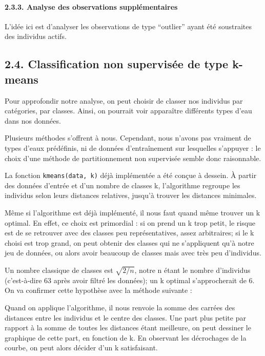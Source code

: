 \documentclass[]{article}
\let\oldparagraph\paragraph
\renewcommand{\paragraph}[1]{\oldparagraph{#1}\mbox{}}
\begin{document}
\hypertarget{analyse-des-observations-supplementaires-1}{\paragraph{2.3.3.
Analyse des observations
supplémentaires}\label{analyse-des-observations-supplementaires-1}}

L'idée ici est d'analyser les observations de type ``outlier'' ayant été
soustraites des individus actifs.

\hypertarget{classification-non-supervisee-de-type-k-means}{\subsection{2.4.
Classification non supervisée de type
k-means}\label{classification-non-supervisee-de-type-k-means}}

Pour approfondir notre analyse, on peut choisir de classer nos individus
par catégories, par classes. Ainsi, on pourrait voir apparaître
différents types d'eau dans nos données.

Plusieurs méthodes s'offrent à nous. Cependant, nous n'avons pas
vraiment de types d'eaux prédéfinis, ni de données d'entraînement sur
lesquelles s'appuyer : le choix d'une méthode de partitionnement non
supervisée semble donc raisonnable.

La fonction \texttt{kmeans(data,\ k)} déjà implémentée a été conçue à
dessein. À partir des données d'entrée et d'un nombre de classes k,
l'algorithme regroupe les individus selon leurs distances relatives,
jusqu'à trouver les distances minimales.

Même si l'algorithme est déjà implémenté, il nous faut quand même
trouver un k optimal. En effet, ce choix est primordial : si on prend un
k trop petit, le risque est de se retrouver avec des classes peu
représentatives, assez arbitraires; si le k choisi est trop grand, on
peut obtenir des classes qui ne s'appliquent qu'à notre jeu de données,
ou alors avoir beaucoup de classes mais avec très peu d'individus.

Un nombre classique de classes est \(\sqrt{2/n}\), notre n étant le
nombre d'individus (c'est-à-dire 63 après avoir filtré les données); un
k optimal s'approcherait de 6. On va confirmer cette hypothèse avec la
méthode suivante :

Quand on applique l'algorithme, il nous renvoie la somme des carrées des
distances entre les individus et le centre des classes. Une part plus
petite par rapport à la somme de toutes les distances étant meilleure,
on peut dessiner le graphique de cette part, en fonction de k. En
observant les décrochages de la courbe, on peut alors décider d'un k
satisfaisant.
\end{document}
